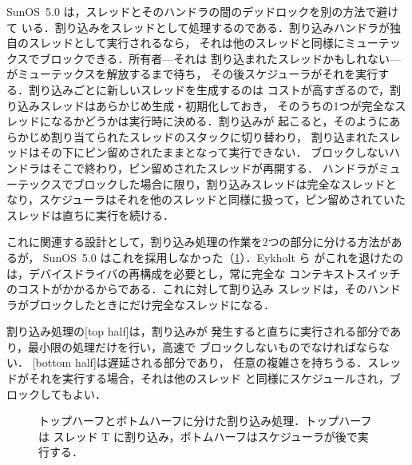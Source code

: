 \documentclass[../main.tex]{subfiles}
\begin{document}
SunOS~5.0 は，スレッドとそのハンドラの間のデッドロックを別の方法で避けて
いる．割り込みをスレッドとして処理するのである．割り込みハンドラが独自のスレッドとして実行されるなら，
それは他のスレッドと同様にミューテックスでブロックできる．所有者---それは
割り込まれたスレッドかもしれない---がミューテックスを解放するまで待ち，
その後スケジューラがそれを実行する．割り込みごとに新しいスレッドを生成するのは
コストが高すぎるので，割り込みスレッドはあらかじめ生成・初期化しておき，
そのうちの1つが完全なスレッドになるかどうかは実行時に決める．割り込みが
起こると，そのようにあらかじめ割り当てられたスレッドのスタックに切り替わり，
割り込まれたスレッドはその下にピン留めされたままとなって実行できない．
ブロックしないハンドラはそこで終わり，ピン留めされたスレッドが再開する．
ハンドラがミューテックスでブロックした場合に限り，割り込みスレッドは完全なスレッドと
なり，スケジューラはそれを他のスレッドと同様に扱って，ピン留めされていた
スレッドは直ちに実行を続ける．

これに関連する設計として，割り込み処理の作業を2つの部分に分ける方法があるが，
SunOS~5.0 はこれを採用しなかった（\cref{fig:l05-top-bottom}）．Eykholt ら
がこれを退けたのは，デバイスドライバの再構成を必要とし，常に完全な
コンテキストスイッチのコストがかかるからである．これに対して割り込み
スレッドは，そのハンドラがブロックしたときにだけ完全なスレッドになる．

\begin{definition}[トップハーフとボトムハーフ]
  割り込み処理の[top half]は，割り込みが
  発生すると直ちに実行される部分であり，最小限の処理だけを行い，高速で
  ブロックしないものでなければならない．
  [bottom half]は遅延される部分であり，
  任意の複雑さを持ちうる．スレッドがそれを実行する場合，それは他のスレッド
  と同様にスケジュールされ，ブロックしてもよい．
\end{definition}

\begin{figure}[htbp]
  \centering
  
  \caption{トップハーフとボトムハーフに分けた割り込み処理．トップハーフは
    スレッド T に割り込み，ボトムハーフはスケジューラが後で実行する．}
  \label{fig:l05-top-bottom}
\end{figure}
\end{document}
